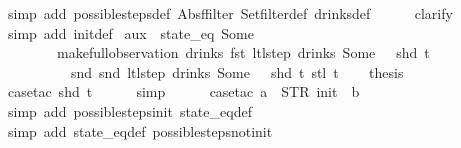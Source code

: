 \begin{isabellebody}
\ {\isacharparenleft}simp\ add{\isacharcolon}\ possible{\isacharunderscore}steps{\isacharunderscore}def\ Abs{\isacharunderscore}ffilter\ Set{\isachardot}filter{\isacharunderscore}def\ drinks{\isacharunderscore}def{\isacharparenright}\isanewline
\ \ \ \ \isamarkupfalse%
\ clarify\isanewline
\ \ \ \ \isamarkupfalse%
\ {\isacharparenleft}simp\ add{\isacharcolon}\ init{\isacharunderscore}def{\isacharparenright}%
\endisatagproof
{\isafoldproof}%
%
\isadelimproof
\isanewline
%
\endisadelimproof
\isanewline
{}\isamarkupfalse%
\ aux{}{\isacharcolon}\ {\isachardoublequoteopen}{\isasymnot}\ state_eq\ {\isacharparenleft}Some\ {}{\isacharparenright}\isanewline
\ \ \ \ \ \ \ \ {\isacharparenleft}make{\isacharunderscore}full{\isacharunderscore}observation\ drinks\ {\isacharparenleft}fst\ {\isacharparenleft}ltl{\isacharunderscore}step\ drinks\ {\isacharparenleft}Some\ {}{\isacharparenright}\ {\isacharless}{\isachargreater}\ {\isacharparenleft}shd\ t{\isacharparenright}{\isacharparenright}{\isacharparenright}\isanewline
\ \ \ \ \ \ \ \ \ \ {\isacharparenleft}snd\ {\isacharparenleft}snd\ {\isacharparenleft}ltl{\isacharunderscore}step\ drinks\ {\isacharparenleft}Some\ {}{\isacharparenright}\ {\isacharless}{\isachargreater}\ {\isacharparenleft}shd\ t{\isacharparenright}{\isacharparenright}{\isacharparenright}{\isacharparenright}\ {\isacharparenleft}stl\ t{\isacharparenright}{\isacharparenright}{\isachardoublequoteclose}\isanewline
%
\isadelimproof
%
\endisadelimproof
%
\isatagproof
{}\isamarkupfalse%
{\isacharminus}\isanewline
\ \ \isamarkupfalse%
\ {\isacharquery}thesis\isanewline
\ \ \ \ \isamarkupfalse%
\ {\isacharparenleft}case{\isacharunderscore}tac\ {\isachardoublequoteopen}shd\ t{\isachardoublequoteclose}{\isacharparenright}\isanewline
\ \ \ \ \isamarkupfalse%
\ simp\isanewline
\ \ \ \ \isamarkupfalse%
\ {\isacharparenleft}case{\isacharunderscore}tac\ {\isachardoublequoteopen}a\ {\isacharequal}\ STR\ {\isacharprime}{\isacharprime}init{\isacharprime}{\isacharprime}\ {\isasymand}\ b\ {\isacharequal}\ {\isacharbrackleft}{\isacharbrackright}{\isachardoublequoteclose}{\isacharparenright}\isanewline
\ \ \ \ \ \isamarkupfalse%
\ {\isacharparenleft}simp\ add{\isacharcolon}\ possible{\isacharunderscore}steps{\isacharunderscore}init\ state_eq{\isacharunderscore}def{\isacharparenright}\isanewline
\ \ \ \ \isamarkupfalse%
\ {\isacharparenleft}simp\ add{\isacharcolon}\ state_eq{\isacharunderscore}def\ possible{\isacharunderscore}steps{\isacharunderscore}not{\isacharunderscore}init{\isacharparenright}\isanewline

\end{isabellebody}
